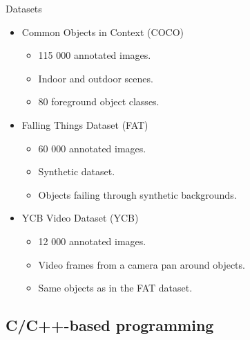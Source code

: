 \documentclass[18pt]{beamer}
\begin{document}
\begin{frame}{Datasets}
\begin{itemize}
    \item Common Objects in Context (COCO)
    \begin{itemize}
        \item 115 000 annotated images.
        \item Indoor and outdoor scenes.
        \item 80 foreground object classes.
    \end{itemize}
    \item Falling Things Dataset (FAT)
    \begin{itemize}
        \item 60 000 annotated images.
        \item Synthetic dataset.
        \item Objects failing through synthetic backgrounds.
    \end{itemize}
    \item YCB Video Dataset (YCB)
    \begin{itemize}
        \item 12 000 annotated images.
        \item Video frames from a camera pan around objects.
        \item Same objects as in the FAT dataset.
    \end{itemize}
\end{itemize}
\end{frame}

\subsection{C/C++-based programming}
\end{document}

